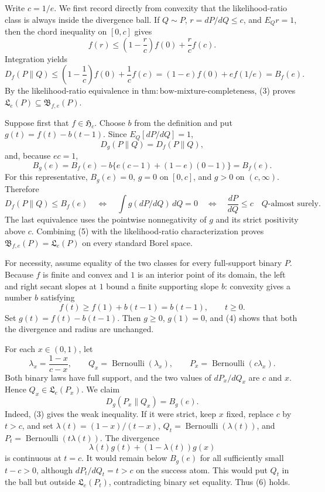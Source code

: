 Write \(c=1/e\).  We first record directly from convexity that the likelihood-ratio class is always inside the divergence ball.  If \(Q\sim P\), \(r=dP/dQ\le c\), and \(E_Qr=1\), then the chord inequality on \([0,c]\) gives
\[
 f(r)\le \left(1-\frac r c\right)f(0)+\frac r c f(c).
\]
Integration yields
\[
 D_f(P\|Q)\le \left(1-\frac1c\right)f(0)+\frac1c f(c)
 =(1-e)f(0)+ef(1/e)=B_f(e). \tag{3}
\]
By the likelihood-ratio equivalence in \(\mathrm{thm:bow\text{-}mixture\text{-}completeness}\), (3) proves \(\mathfrak L_e(P)\subseteq\mathfrak B_{f,e}(P)\).

Suppose first that \(f\in\mathfrak H_c\).  Choose \(b\) from the definition and put \(g(t)=f(t)-b(t-1)\).  Since \(E_Q[dP/dQ]=1\),
\[
 D_g(P\|Q)=D_f(P\|Q),
\]
and, because \(ec=1\),
\[
 B_g(e)=B_f(e)-b\{e(c-1)+(1-e)(0-1)\}=B_f(e). \tag{4}
\]
For this representative, \(B_g(e)=0\), \(g=0\) on \([0,c]\), and \(g>0\) on \((c,\infty)\).  Therefore
\[
 D_f(P\|Q)\le B_f(e)
 \quad\Longleftrightarrow\quad
 \int g(dP/dQ)\,dQ=0
 \quad\Longleftrightarrow\quad
 \frac{dP}{dQ}\le c\quad Q\text{-almost surely}. \tag{5}
\]
The last equivalence uses the pointwise nonnegativity of \(g\) and its strict positivity above \(c\).  Combining (5) with the likelihood-ratio characterization proves \(\mathfrak B_{f,e}(P)=\mathfrak L_e(P)\) on every standard Borel space.

For necessity, assume equality of the two classes for every full-support binary \(P\).  Because \(f\) is finite and convex and \(1\) is an interior point of its domain, the left and right secant slopes at \(1\) bound a finite supporting slope \(b\): convexity gives a number \(b\) satisfying
\[
 f(t)\ge f(1)+b(t-1)=b(t-1),\qquad t\ge0.
\]
Set \(g(t)=f(t)-b(t-1)\).  Then \(g\ge0\), \(g(1)=0\), and (4) shows that both the divergence and radius are unchanged.

For each \(x\in(0,1)\), let
\[
 \lambda_x=\frac{1-x}{c-x},\qquad
 Q_x=\operatorname{Bernoulli}(\lambda_x),\qquad
 P_x=\operatorname{Bernoulli}(c\lambda_x).
\]
Both binary laws have full support, and the two values of \(dP_x/dQ_x\) are \(c\) and \(x\).  Hence \(Q_x\in\mathfrak L_e(P_x)\).  We claim
\[
 D_g(P_x\|Q_x)=B_g(e). \tag{6}
\]
Indeed, (3) gives the weak inequality.  If it were strict, keep \(x\) fixed, replace \(c\) by \(t>c\), and set \(\lambda(t)=(1-x)/(t-x)\), \(Q_t=\operatorname{Bernoulli}(\lambda(t))\), and \(P_t=\operatorname{Bernoulli}(t\lambda(t))\).  The divergence
\[
 \lambda(t)g(t)+(1-\lambda(t))g(x)
\]
is continuous at \(t=c\).  It would remain below \(B_g(e)\) for all sufficiently small \(t-c>0\), although \(dP_t/dQ_t=t>c\) on the success atom.  This would put \(Q_t\) in the ball but outside \(\mathfrak L_e(P_t)\), contradicting binary set equality.  Thus (6) holds.

